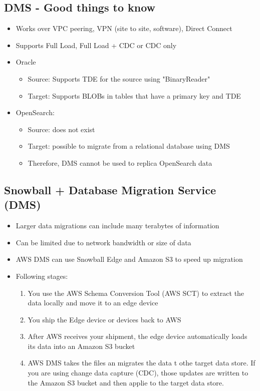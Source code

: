 {{\subsection{DMS - Good things to know}
\begin{itemize}
    \item Works over VPC peering, VPN (site to site, software), Direct Connect
    \item Supports Full Load, Full Load + CDC or CDC only
    \item Oracle
    \begin{itemize}
        \item Source: Supports TDE for the source using "BinaryReader"
        \item Target: Supports BLOBs in tables that have a primary key and TDE
    \end{itemize}
    \item OpenSearch:
    \begin{itemize}
        \item Source: does not exist
        \item Target: possible to migrate from a relational database using DMS
        \item Therefore, DMS cannot be used to replica OpenSearch data
    \end{itemize}
\end{itemize}

\subsection{Snowball + Database Migration Service (DMS)}
\begin{itemize}
    \item Larger data migrations can include many terabytes of information
    \item Can be limited due to network bandwidth or size of data
    \item AWS DMS can use Snowball Edge and Amazon S3 to speed up migration
    \item Following stages:
    \begin{enumerate}
        \item You use the AWS Schema Conversion Tool (AWS SCT) to extract the data locally and move it to an edge device
        \item You ship the Edge device or devices back to AWS
        \item After AWS receives your shipment, the edge device automatically loads its data into an Amazon S3 bucket
        \item AWS DMS takes the files an migrates the data t othe target data store. If you are using change data capture (CDC), those updates are written to the Amazon S3 bucket and then applie to the target data store.
    \end{enumerate}
\end{itemize}


}}
